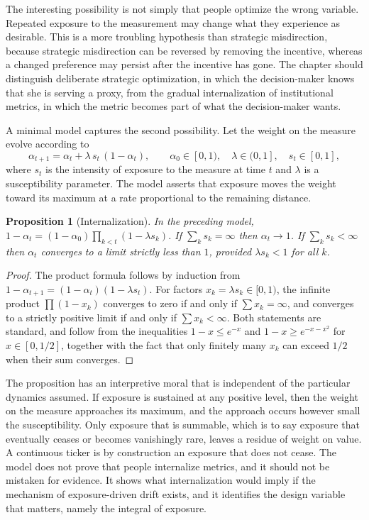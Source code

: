 \documentclass[11pt]{report}
\newtheorem{proposition}[theorem]{Proposition}
\theoremstyle{definition}
\theoremstyle{remark}
\begin{document}
The interesting possibility is not simply that people optimize the wrong variable. Repeated exposure to the measurement may change what they experience as desirable. This is a more troubling hypothesis than strategic misdirection, because strategic misdirection can be reversed by removing the incentive, whereas a changed preference may persist after the incentive has gone. The chapter should distinguish deliberate strategic optimization, in which the decision-maker knows that she is serving a proxy, from the gradual internalization of institutional metrics, in which the metric becomes part of what the decision-maker wants.

A minimal model captures the second possibility. Let the weight on the measure evolve according to
\[
\alpha_{t+1}=\alpha_t+\lambda\,s_t\,(1-\alpha_t),\qquad \alpha_0\in[0,1),\quad \lambda\in(0,1],\quad s_t\in[0,1],
\]
where $s_t$ is the intensity of exposure to the measure at time $t$ and $\lambda$ is a susceptibility parameter. The model asserts that exposure moves the weight toward its maximum at a rate proportional to the remaining distance.

\begin{proposition}[Internalization]\label{prop:internal}
In the preceding model, $1-\alpha_t=(1-\alpha_0)\prod_{k<t}(1-\lambda s_k)$. If $\sum_k s_k=\infty$ then $\alpha_t\to1$. If $\sum_k s_k<\infty$ then $\alpha_t$ converges to a limit strictly less than $1$, provided $\lambda s_k<1$ for all $k$.
\end{proposition}

\begin{proof}
The product formula follows by induction from $1-\alpha_{t+1}=(1-\alpha_t)(1-\lambda s_t)$. For factors $x_k=\lambda s_k\in[0,1)$, the infinite product $\prod(1-x_k)$ converges to zero if and only if $\sum x_k=\infty$, and converges to a strictly positive limit if and only if $\sum x_k<\infty$. Both statements are standard, and follow from the inequalities $1-x\le e^{-x}$ and $1-x\ge e^{-x-x^2}$ for $x\in[0,1/2]$, together with the fact that only finitely many $x_k$ can exceed $1/2$ when their sum converges.
\end{proof}

The proposition has an interpretive moral that is independent of the particular dynamics assumed. If exposure is sustained at any positive level, then the weight on the measure approaches its maximum, and the approach occurs however small the susceptibility. Only exposure that is summable, which is to say exposure that eventually ceases or becomes vanishingly rare, leaves a residue of weight on value. A continuous ticker is by construction an exposure that does not cease. The model does not prove that people internalize metrics, and it should not be mistaken for evidence. It shows what internalization would imply if the mechanism of exposure-driven drift exists, and it identifies the design variable that matters, namely the integral of exposure.
\end{document}
